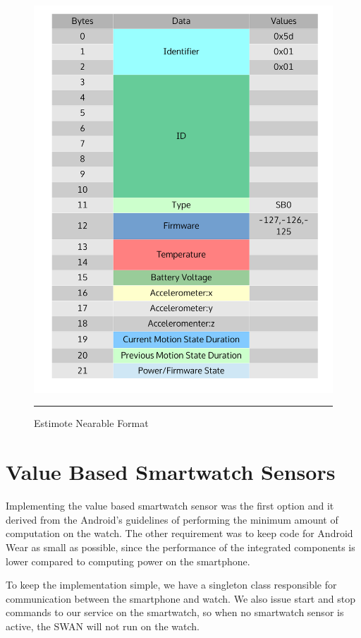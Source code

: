 \begin{figure}[htbp]
  \centering
    \includegraphics[scale=0.4]{Figures/data_format.pdf}
    \rule{35em}{0.5pt}
  \caption[Estimote Nearable Format]{Estimote Nearable Format}
  \label{fig:estimote_format}
\end{figure}

\section{ Value Based Smartwatch Sensors }
Implementing the value based smartwatch sensor was the first option and it derived from the Android's guidelines of performing the minimum amount of computation on the watch.
The other requirement was to keep code for Android Wear as small as possible, since the performance of the integrated components is lower compared to computing power on the smartphone.

To keep the implementation simple, we have a singleton class  responsible for communication between the smartphone and watch. We also issue start and stop commands to our service on the smartwatch,
so when no smartwatch sensor is active, the SWAN will not run on the watch.

